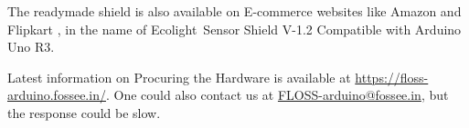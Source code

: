 
The readymade shield is also available on E-commerce websites like Amazon \cite{amazon-shield}
and Flipkart \cite{flipkart-shield}, in the name of Ecolight\textregistered \ Sensor Shield V-1.2
Compatible with Arduino Uno R3.


Latest information on Procuring the Hardware is available at \url{https://floss-arduino.fossee.in/}. 
One could also contact us at \href{mailto:FLOSS-arduino@fossee.in}{FLOSS-arduino@fossee.in}, but the response could be slow.





